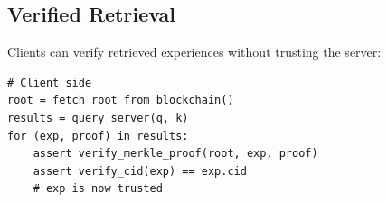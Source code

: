 \subsection{Verified Retrieval}

Clients can verify retrieved experiences without trusting the server:

\begin{lstlisting}[caption=Verified Retrieval Protocol]
# Client side
root = fetch_root_from_blockchain()
results = query_server(q, k)
for (exp, proof) in results:
    assert verify_merkle_proof(root, exp, proof)
    assert verify_cid(exp) == exp.cid
    # exp is now trusted
\end{lstlisting}

